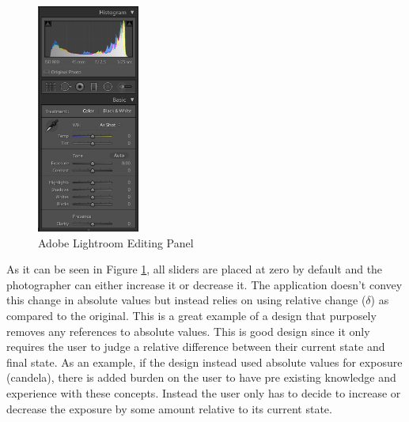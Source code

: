 \documentclass[12pt]{article}
\begin{document}
	\begin{figure}[!ht]
		\centering
		\includegraphics[width=0.3\textwidth]{lightroom}
		\caption{Adobe Lightroom Editing Panel}
		\label{lightroom}
	\end{figure}
	
As it can be seen in Figure \ref{lightroom}, all sliders are placed at zero by default and the photographer can either increase it or decrease it. The application doesn't convey this change in absolute values but instead relies on using relative change ($\delta$) as compared to the original. This is a great example of a design that purposely removes any references to absolute values. This is good design since it only requires the user to judge a relative difference between their current state and final state. As an example, if the design instead used absolute values for exposure (candela), there is added burden on the user to have pre existing knowledge and experience with these concepts. Instead the user only has to decide to increase or decrease the exposure by some amount relative to its current state. 
\end{document}
